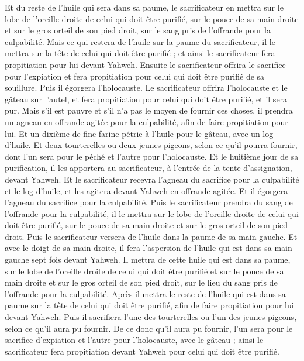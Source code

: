 \begin{multicols}{2}
Et du reste de l'huile qui sera dans sa paume, le sacrificateur en mettra sur le lobe de l'oreille droite de celui qui doit être purifié, sur le pouce de sa main droite et sur le gros orteil de son pied droit, sur le sang pris de l'offrande pour la culpabilité.
Mais ce qui restera de l'huile sur la paume du sacrificateur, il le mettra sur la tête de celui qui doit être purifié ; et ainsi le sacrificateur fera propitiation pour lui devant Yahweh.
Ensuite le sacrificateur offrira le sacrifice pour l'expiation et fera propitiation pour celui qui doit être purifié de sa souillure. Puis il égorgera l'holocauste.
Le sacrificateur offrira l'holocauste et le gâteau sur l'autel, et fera propitiation pour celui qui doit être purifié, et il sera pur.
Mais s'il est pauvre et s'il n'a pas le moyen de fournir ces choses, il prendra un agneau en offrande agitée pour la culpabilité, afin de faire propitiation pour lui. Et un dixième de fine farine pétrie à l'huile pour le gâteau, avec un log d'huile.
Et deux tourterelles ou deux jeunes pigeons, selon ce qu'il pourra fournir, dont l'un sera pour le péché et l'autre pour l'holocauste.
Et le huitième jour de sa purification, il les apportera au sacrificateur, à l'entrée de la tente d'assignation, devant Yahweh.
Et le sacrificateur recevra l'agneau du sacrifice pour la culpabilité et le log d'huile, et les agitera devant Yahweh en offrande agitée.
Et il égorgera l'agneau du sacrifice pour la culpabilité. Puis le sacrificateur prendra du sang de l'offrande pour la culpabilité, il le mettra sur le lobe de l'oreille droite de celui qui doit être purifié, sur le pouce de sa main droite et sur le gros orteil de son pied droit.
Puis le sacrificateur versera de l'huile dans la paume de sa main gauche.
Et avec le doigt de sa main droite, il fera l'aspersion de l'huile qui est dans sa main gauche sept fois devant Yahweh.
Il mettra de cette huile qui est dans sa paume, sur le lobe de l'oreille droite de celui qui doit être purifié et sur le pouce de sa main droite et sur le gros orteil de son pied droit, sur le lieu du sang pris de l'offrande pour la culpabilité.
Après il mettra le reste de l'huile qui est dans sa paume sur la tête de celui qui doit être purifié, afin de faire propitiation pour lui devant Yahweh.
Puis il sacrifiera l'une des tourterelles ou l'un des jeunes pigeons, selon ce qu'il aura pu fournir.
De ce donc qu'il aura pu fournir, l'un sera pour le sacrifice d'expiation et l'autre pour l'holocauste, avec le gâteau ; ainsi le sacrificateur fera propitiation devant Yahweh pour celui qui doit être purifié.

\end{multicols}
